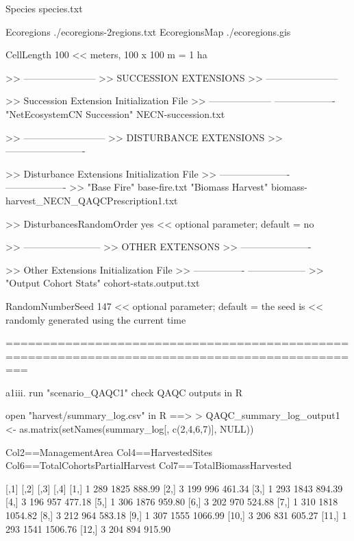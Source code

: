 Species   species.txt

Ecoregions      ./ecoregions-2regions.txt
EcoregionsMap   ./ecoregions.gis

CellLength  100 << meters, 100 x 100 m = 1 ha


>> -----------------------
>> SUCCESSION EXTENSIONS
>> -----------------------

>> 	Succession Extension     	Initialization File
>> 	--------------------     	-------------------
   	"NetEcosystemCN Succession"	NECN-succession.txt


>> --------------------------
>> DISTURBANCE EXTENSIONS
>> -------------------------

>> 	Disturbance Extensions   	Initialization File
>>	 ----------------------   	-------------------
>>	"Base Fire"			base-fire.txt
	"Biomass Harvest"		biomass-harvest_NECN_QAQCPrescription1.txt


>>   DisturbancesRandomOrder  yes  << optional parameter; default = no

>> ------------------------
>> OTHER EXTENSONS
>> ----------------------

>> 	Other Extensions         	Initialization File
>>	 ----------------         	------------------
>>  	 "Output Cohort Stats"    	cohort-stats.output.txt


RandomNumberSeed  147  << optional parameter; default = the seed is
                         << randomly generated using the current time

===============================================================================================



	a1iii. run "scenario_QAQC1" check QAQC outputs in R

open "harvest/summary_log.csv" in R ==>
> QAQC_summary_log_output1 <- as.matrix(setNames(summary_log[, c(2,4,6,7)], NULL))

Col2==ManagementArea
Col4==HarvestedSites
Col6==TotalCohortsPartialHarvest
Col7==TotalBiomassHarvested

      [,1] [,2] [,3]    [,4]
 [1,]    1  289 1825  888.99
 [2,]    3  199  996  461.34
 [3,]    1  293 1843  894.39
 [4,]    3  196  957  477.18
 [5,]    1  306 1876  959.80
 [6,]    3  202  970  524.88
 [7,]    1  310 1818 1054.82
 [8,]    3  212  964  583.18
 [9,]    1  307 1555 1066.99
[10,]    3  206  831  605.27
[11,]    1  293 1541 1506.76
[12,]    3  204  894  915.90





